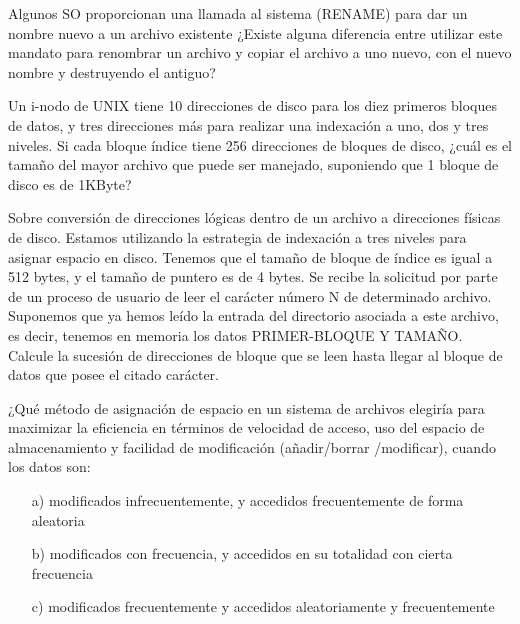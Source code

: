 \begin{ejercicio}
Algunos SO proporcionan una llamada al sistema (RENAME) para dar un nombre nuevo a un archivo existente ¿Existe alguna diferencia entre utilizar este mandato para renombrar un archivo y copiar el archivo a uno nuevo, con el nuevo nombre y destruyendo el antiguo?
\end{ejercicio}

\begin{ejercicio}
Un i-nodo de UNIX tiene 10 direcciones de disco para los diez primeros bloques de datos, y tres direcciones más para realizar una indexación a uno, dos y tres niveles. Si cada bloque índice tiene 256 direcciones de bloques de disco, ¿cuál es el tamaño del mayor archivo que puede ser manejado, suponiendo que 1 bloque de disco es de 1KByte?
\end{ejercicio}

\begin{ejercicio}
Sobre conversión de direcciones lógicas dentro de un archivo a direcciones físicas de disco. Estamos utilizando la estrategia de indexación a tres niveles para asignar espacio en disco. Tenemos que el tamaño de bloque de índice es igual a 512 bytes, y el tamaño de puntero es de 4 bytes. Se recibe la solicitud por parte de un proceso de usuario de leer el carácter número N de determinado archivo. Suponemos que ya hemos leído la entrada del directorio asociada a este archivo, es decir, tenemos en memoria los datos PRIMER-BLOQUE Y TAMAÑO. Calcule la sucesión de direcciones de bloque que se leen hasta llegar al bloque de datos que posee el citado carácter.
\end{ejercicio}

\begin{ejercicio}
¿Qué método de asignación de espacio en un sistema de archivos elegiría para maximizar la eficiencia en términos de velocidad de acceso, uso del espacio de almacenamiento y facilidad de modificación (añadir/borrar /modificar), cuando los datos son:
\begin{itemize}
    \item[a)] modificados infrecuentemente, y accedidos frecuentemente de forma aleatoria
    \item[b)] modificados con frecuencia, y accedidos en su totalidad con cierta frecuencia
    \item[c)] modificados frecuentemente y accedidos aleatoriamente y frecuentemente
\end{itemize}
\end{ejercicio}

